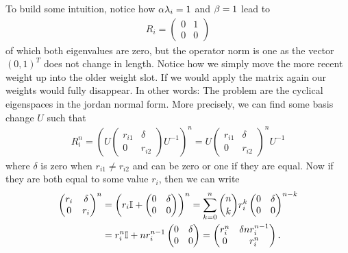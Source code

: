 To build some intuition, notice how \(\alpha\lambda_i=1\) and \(\beta=1\)
lead to
\begin{align*}
	R_i
	=\begin{pmatrix}
		0 & 1 \\
		0 & 0
	\end{pmatrix}
\end{align*}
of which both eigenvalues are zero, but the operator norm is one as the vector
\((0, 1)^T\) does not change in length. Notice how we simply move the more
recent weight up into the older weight slot. If we would apply the matrix again
our weights would fully disappear. In other words: The problem are the cyclical
eigenspaces in the jordan normal form. More precisely, we can find some
basis change \(U\) such that
\begin{align*}
	R_i^n
	= \left(U 
		\begin{pmatrix}
			r_{i1} & \delta\\
			0 & r_{i2}
		\end{pmatrix}
	U^{-1}\right)^n
	= U 
	\begin{pmatrix}
		r_{i1} & \delta\\
		0 & r_{i2}
	\end{pmatrix}^n
	 U^{-1}
\end{align*}
where \(\delta\) is zero when \(r_{i1}\neq r_{i2}\) and can be zero or one if
they are equal. Now if they are both equal to some value \(r_i\), then we
can write
\begin{align*}
	\begin{pmatrix}
		r_i & \delta\\
		0 & r_i
	\end{pmatrix}^n
	&= \left(r_i\mathbb{I} + 
	\begin{pmatrix}
		0 & \delta\\
		0 & 0 
	\end{pmatrix}\right)^n
	= \sum_{k=0}^n \binom{n}{k} r_i^k \begin{pmatrix}
		0 & \delta \\
		0 & 0
	\end{pmatrix}^{n-k}\\
	&= r_i^n\mathbb{I} + n r_i^{n-1}\begin{pmatrix}
		0 & \delta \\
		0 & 0
	\end{pmatrix}
	= \begin{pmatrix}
		r_i^n & \delta n r_i^{n-1} \\
		0 & r_i^n
	\end{pmatrix}.
\end{align*}
